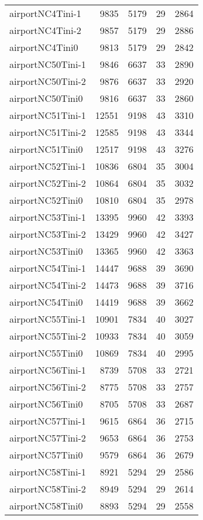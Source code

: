 \begin{tabular}{lrrrr}
airportNC4Tini-1 & 9835 & 5179 & 29 & 2864 \\
airportNC4Tini-2 & 9857 & 5179 & 29 & 2886 \\
airportNC4Tini0 & 9813 & 5179 & 29 & 2842 \\
airportNC50Tini-1 & 9846 & 6637 & 33 & 2890 \\
airportNC50Tini-2 & 9876 & 6637 & 33 & 2920 \\
airportNC50Tini0 & 9816 & 6637 & 33 & 2860 \\
airportNC51Tini-1 & 12551 & 9198 & 43 & 3310 \\
airportNC51Tini-2 & 12585 & 9198 & 43 & 3344 \\
airportNC51Tini0 & 12517 & 9198 & 43 & 3276 \\
airportNC52Tini-1 & 10836 & 6804 & 35 & 3004 \\
airportNC52Tini-2 & 10864 & 6804 & 35 & 3032 \\
airportNC52Tini0 & 10810 & 6804 & 35 & 2978 \\
airportNC53Tini-1 & 13395 & 9960 & 42 & 3393 \\
airportNC53Tini-2 & 13429 & 9960 & 42 & 3427 \\
airportNC53Tini0 & 13365 & 9960 & 42 & 3363 \\
airportNC54Tini-1 & 14447 & 9688 & 39 & 3690 \\
airportNC54Tini-2 & 14473 & 9688 & 39 & 3716 \\
airportNC54Tini0 & 14419 & 9688 & 39 & 3662 \\
airportNC55Tini-1 & 10901 & 7834 & 40 & 3027 \\
airportNC55Tini-2 & 10933 & 7834 & 40 & 3059 \\
airportNC55Tini0 & 10869 & 7834 & 40 & 2995 \\
airportNC56Tini-1 & 8739 & 5708 & 33 & 2721 \\
airportNC56Tini-2 & 8775 & 5708 & 33 & 2757 \\
airportNC56Tini0 & 8705 & 5708 & 33 & 2687 \\
airportNC57Tini-1 & 9615 & 6864 & 36 & 2715 \\
airportNC57Tini-2 & 9653 & 6864 & 36 & 2753 \\
airportNC57Tini0 & 9579 & 6864 & 36 & 2679 \\
airportNC58Tini-1 & 8921 & 5294 & 29 & 2586 \\
airportNC58Tini-2 & 8949 & 5294 & 29 & 2614 \\
airportNC58Tini0 & 8893 & 5294 & 29 & 2558 \\

\end{tabular}
